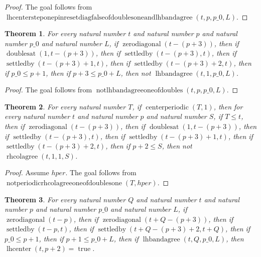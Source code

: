 \documentclass[11pt]{article}
\newtheorem{theorem}{Theorem}[section]
\theoremstyle{definition}
\begin{document}
\begin{proof}
The goal follows from \(\operatorname{lhcentersteponepinresetdiagfalseofdoublesoneandlhbandagree}(t, p, p\_0, L)\).
\end{proof}
\begin{theorem}
\label{ll:paper:not-lhbandagree-one-of-doubles}
For every natural number \(t\) and natural number \(p\) and natural number \(p\_0\) and natural number \(L\), if \(\operatorname{zerodiagonal}(t - (p + 3))\), then if \(\operatorname{doublesat}(1, t - (p + 3))\), then if \(\operatorname{settledby}(t - (p + 3), t)\), then if \(\operatorname{settledby}(t - (p + 3) + 1, t)\), then if \(\operatorname{settledby}(t - (p + 3) + 2, t)\), then if \(p\_0 \le p + 1\), then if \(p + 3 \le p\_0 + L\), then not \(\operatorname{lhbandagree}(t, 1, p\_0, L)\).
\end{theorem}
\begin{proof}
The goal follows from \(\operatorname{notlhbandagreeoneofdoubles}(t, p, p\_0, L)\).
\end{proof}
\begin{theorem}
\label{ll:paper:not-periodic-rhcolagree-one-of-doubles-one}
For every natural number \(T\), if \(\operatorname{centerperiodic}(T, 1)\), then for every natural number \(t\) and natural number \(p\) and natural number \(S\), if \(T \le t\), then if \(\operatorname{zerodiagonal}(t - (p + 3))\), then if \(\operatorname{doublesat}(1, t - (p + 3))\), then if \(\operatorname{settledby}(t - (p + 3), t)\), then if \(\operatorname{settledby}(t - (p + 3) + 1, t)\), then if \(\operatorname{settledby}(t - (p + 3) + 2, t)\), then if \(p + 2 \le S\), then not \(\operatorname{rhcolagree}(t, 1, 1, S)\).
\end{theorem}
\begin{proof}
Assume \(hper\).
The goal follows from \(\operatorname{notperiodicrhcolagreeoneofdoublesone}(T, hper)\).
\end{proof}
\begin{theorem}
\label{ll:paper:lhcenter-pin-plus-two-true-of-lhbandagree-and-zero-diag-three}
For every natural number \(Q\) and natural number \(t\) and natural number \(p\) and natural number \(p\_0\) and natural number \(L\), if \(\operatorname{zerodiagonal}(t - p)\), then if \(\operatorname{zerodiagonal}(t + Q - (p + 3))\), then if \(\operatorname{settledby}(t - p, t)\), then if \(\operatorname{settledby}(t + Q - (p + 3) + 2, t + Q)\), then if \(p\_0 \le p + 1\), then if \(p + 1 \le p\_0 + L\), then if \(\operatorname{lhbandagree}(t, Q, p\_0, L)\), then \(\operatorname{lhcenter}(t, p + 2) = \operatorname{true}\).
\end{theorem}
\end{document}
